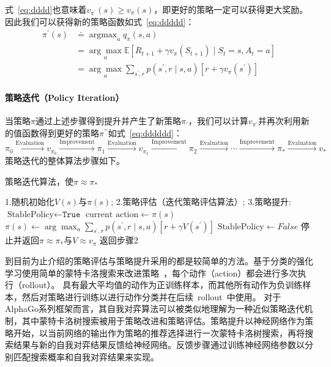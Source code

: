式~\ref{eq:dddd}也意味着$v_{\pi^{\prime}}(s) \geq v_{\pi}(s)$，即更好的策略一定可以获得更大奖励。因此我们可以获得新的策略函数如式~\ref{eq:ddddd}：
\begin{equation}
  \begin{aligned}
  \pi^{\prime}(s) & \doteq \mathop{\arg \max }_a q_{\pi}(s, a) \\
  &=\underset{a}{\arg \max } \mathbb{E}\left[R_{t+1}+\gamma v_{\pi}\left(S_{t+1}\right) \mid S_{t}=s, A_{t}=a\right] \\
  &=\underset{a}{\arg \max } \sum_{s^{\prime}, r} p\left(s^{\prime}, r \mid s, a\right)\left[r+\gamma v_{\pi}\left(s^{\prime}\right)\right]
  \end{aligned}
  \label{eq:ddddd}
\end{equation}

\paragraph{策略迭代（Policy Iteration）}
当策略$\pi$通过上述步骤得到提升并产生了新策略$\pi_{\prime}$，我们可以计算$v_{\pi^{\prime}}$并再次利用新的值函数得到更好的策略$\pi^{\prime\prime}$如式~\ref{eq:dddddd}：
\begin{equation}
  \pi_{0} \stackrel{\mathrm{Evaluation}}{\longrightarrow} v_{\pi_{0}} \stackrel{\mathrm{Improvement}}{\longrightarrow} \pi_{1} \stackrel{\mathrm{Evaluation}}{\longrightarrow} v_{\pi_{1}} \stackrel{\mathrm{Improvement}}{\longrightarrow} \pi_{2} \stackrel{\mathrm{Evaluation}}{\longrightarrow} \cdots \stackrel{\mathrm{Improvement}}{\longrightarrow} \pi_{*} \stackrel{\mathrm{Evaluation}}{\longrightarrow} v_{*}
  \label{eq:dddddd}
\end{equation}
策略迭代的整体算法步骤如下。
\begin{algorithm}[H]
  \caption{策略迭代算法，使$\pi \approx \pi_{*} $}
  \begin{algorithmic}
    \State 1.随机初始化$V(s)$与$\pi(s)$;
    \State 2.策略评估（迭代策略评估算法）;
    \State 3.策略提升:
    \State $\text{StablePolicy} \leftarrow \texttt{True}$
    \State $\text{current action}\leftarrow\pi(s)$
    \State $\pi(s) \leftarrow \arg \max _{a} \sum_{s^{\prime}, r} p\left(s^{\prime}, r \mid s, a\right)\left[r+\gamma V\left(s^{\prime}\right)\right]$
    \State $\text{StablePolicy} \leftarrow False$
    \ENDIF
    \EndFor
    \State 停止并返回$\pi \approx \pi_{*} $与$V\approx v_{\pi} $
    \ELSE 
    \State 返回步骤2
    \ENDIF
  \end{algorithmic}
\end{algorithm}
到目前为止介绍的策略评估与策略提升采用的都是较简单的方法。基于分类的强化学习使用简单的蒙特卡洛搜索来改进策略~\cite{RLC}，每个动作（action）都会进行多次执行（rollout）。 具有最大平均值的动作为正训练样本，而其他所有动作为负训练样本，然后对策略进行训练以进行动作分类并在后续~rollout~中使用。
对于AlphaGo系列框架而言，其自我对弈算法可以被类似地理解为一种近似策略迭代机制，其中蒙特卡洛树搜索被用于策略改进和策略评估。策略提升以神经网络作为策略开始，以当前网络的输出作为策略的推荐选择进行一次蒙特卡洛树搜索，再将搜索结果与新的自我对弈结果反馈给神经网络。反馈步骤通过训练神经网络参数以分别匹配搜索概率和自我对弈结果来实现。
